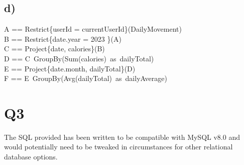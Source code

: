 \documentclass{article}
\begin{document}
\subsection*{\small d)}
\begin{zed}
A == Restrict\{userId = currentUserId\}(DailyMovement) \\
B == Restrict\{date.year = 2023 \}(A) \\
C == Project\{date, calories\}(B) \\
D == C\ GroupBy(Sum(calories)\ as\ dailyTotal) \\ 
E == Project\{date.month, dailyTotal\}(D) \\ 
F == E\ GroupBy(Avg(dailyTotal)\ as\ dailyAverage) \\
\end{zed}

\pagebreak
\section*{Q3}
The SQL provided has been written to be compatible with MySQL v8.0 and would potentially need to be tweaked in circumstances for other relational database options.
\vspace{-0.25cm}
\end{document}
